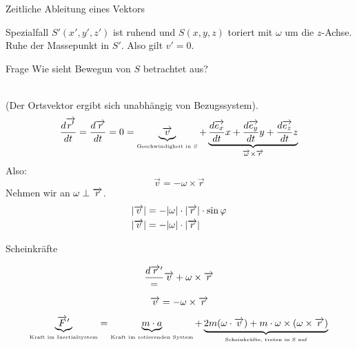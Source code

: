 \documentclass[a4paper,10pt]{scrartcl}
\begin{document}
\begin{enumerate}[a)]
\begin{seg}{Zeitliche Ableitung eines Vektors}
\[\]
\end{seg}
\begin{seg}{Spezialfall} 
$S'(x',y',z')$ ist ruhend und $S(x,y,z)$ toriert mit $\omega$ um die $z$-Achse. Ruhe der Massepunkt in $S'$. Also gilt $v'=0$.
\end{seg} 
\begin{seg}{Frage}
Wie sieht Bewegun von $S$ betrachtet aus?
\end{seg}
\\
(Der Ortsvektor ergibt sich unabhängig von Bezugssystem).
\[
 \frac{d\overrightarrow{r'}}{dt}=\frac{d\overrightarrow{r}}{dt}=0=\underbrace{\overrightarrow{v}}_{\text{\tiny{Geschwindigkeit in $S$}}}+
\underbrace{\frac{d\overrightarrow{e_x}}{dt}x+\frac{d\overrightarrow{e_y}}{dt}y+\frac{d\overrightarrow{e_z}}{dt}z}_{\overrightarrow{\omega}\times\overrightarrow{r}}
\]
Also:
\[
 \boxed{\vec v=-\omega \times \vec r}
\]
Nehmen wir an $\omega \perp \overrightarrow{r}$.
\begin{align*}
|\overrightarrow{v}|&=-|\omega|\cdot |\overrightarrow{r}|\cdot \sin\varphi\\
|\overrightarrow{v}|&=-|\omega|\cdot |\overrightarrow{r}|
\end{align*}
%
\begin{seg}{Scheinkräfte}

\end{seg}
\[
 \frac{d\overrightarrow{r}'}=\overrightarrow{v}+\omega\times \overrightarrow{r}
\]

\[
 \overrightarrow{v}=-\omega\times \overrightarrow{r}
\]
%
 \[
  \underbrace{\overrightarrow{F}'}_{\text{\tiny{Kraft im Inertialsystem}}}=\underbrace{m\cdot a}_{\text{\tiny{Kraft im rotierenden System}}}
 +\underbrace{2m(\omega\cdot \overrightarrow{v})+m\cdot \omega\times (\omega\times \overrightarrow{r})}_{\text{\tiny{Scheinkräfte, treten in S auf}}}
 \]
 

\end{enumerate}
\end{document}
